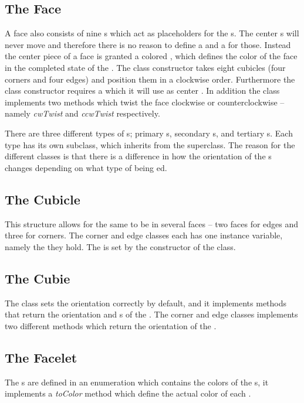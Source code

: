 \subsection{The Face}
A face also consists of nine \cubicle{}s which act as placeholders for the \cpiece{}s. The center \cpiece{}s will never move and therefore there is no reason to define a \cubicle{} and a \cpiece{} for those. Instead the center piece of a face is granted a colored \facelet{}, which defines the color of the face in the completed state of the \rubik{}.
The \face{} class constructor takes eight cubicles (four corners and four edges) and position them in a clockwise order. Furthermore the \face{} class constructor requires a \facelet{} which it will use as center \facelet{}. In addition the \face{} class implements two methods which twist the face clockwise or counterclockwise -- namely \textit{cwTwist} and \textit{ccwTwist} respectively.

There are three different types of \face{}s; primary \face{}s, secondary \face{}s, and tertiary \face{}s.
Each type has its own subclass, which inherits from the \face{} superclass.
The reason for the different classes is that there is a difference in how the orientation of the \cubie{}s changes depending on what type of \face{} being \twist{}ed.

\subsection{The Cubicle}
This structure allows for the same \cubicle{} to be in several faces -- two faces for edges and three for corners. 
The corner and edge \cubicle{} classes each has one instance variable, namely the \cubie{} they hold. The \cpiece{} is set by the constructor of the \cubicle{} class.

\subsection{The Cubie}
The \cpiece{} class sets the orientation correctly by default, and it implements methods that return the orientation and \facelet{}s of the \cpiece{}. The corner and edge \cpiece{} classes implements two different methods which return the orientation of the \cpiece{}.

\subsection{The Facelet}
The \facelet{}s are defined in an enumeration which contains the colors of the \facelet{}s, it implements a \textit{toColor} method which define the actual color of each \facelet{}.